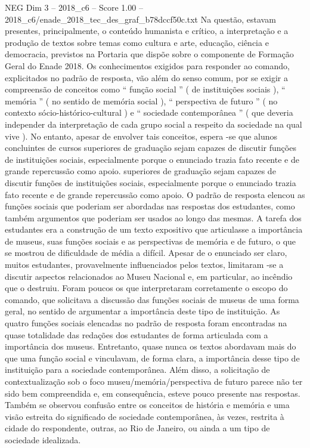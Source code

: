 \begin{textsample}{NEG Dim 3 – 2018\_c6 – Score 1.00 – 2018\_c6/enade\_2018\_tec\_des\_graf\_b78dccf50c.txt}
Na questão, estavam presentes, principalmente, o conteúdo humanista e crítico, a interpretação e a produção de textos sobre temas como cultura e arte, educação, ciência e democracia, previstos na Portaria que dispõe sobre o componente de Formação Geral do Enade 2018.
Os conhecimentos exigidos para responder ao comando, explicitados no padrão de resposta, vão além do senso comum, por se exigir a compreensão de conceitos como “ função social ” ( de instituições sociais ), “ memória ” ( no sentido de memória social ), “ perspectiva de futuro ” ( no contexto sócio-histórico-cultural ) e “ sociedade contemporânea ” ( que deveria independer da interpretação de cada grupo social a respeito da sociedade na qual vive ).
No entanto, apesar de envolver tais conceitos, espera -se que alunos concluintes de cursos superiores de graduação sejam capazes de discutir funções de instituições sociais, especialmente porque o enunciado trazia fato recente e de grande repercussão como apoio. superiores de graduação sejam capazes de discutir funções de instituições sociais, especialmente porque o enunciado trazia fato recente e de grande repercussão como apoio.
O padrão de resposta elencou as funções sociais que poderiam ser abordadas nas respostas dos estudantes, como também argumentos que poderiam ser usados ao longo das mesmas.
A tarefa dos estudantes era a construção de um texto expositivo que articulasse a importância de museus, suas funções sociais e as perspectivas de memória e de futuro, o que se mostrou de dificuldade de média a difícil.
Apesar de o enunciado ser claro, muitos estudantes, provavelmente influenciados pelos textos, limitaram -se a discutir aspectos relacionados ao Museu Nacional e, em particular, ao incêndio que o destruiu.
Foram poucos os que interpretaram corretamente o escopo do comando, que solicitava a discussão das funções sociais de museus de uma forma geral, no sentido de argumentar a importância deste tipo de instituição.
As quatro funções sociais elencadas no padrão de resposta foram encontradas na quase totalidade das redações dos estudantes de forma articulada com a importância dos museus.
Entretanto, quase nunca os textos abordavam mais do que uma função social e vinculavam, de forma clara, a importância desse tipo de instituição para a sociedade contemporânea.
Além disso, a solicitação de contextualização sob o foco museu/memória/perspectiva de futuro parece não ter sido bem compreendida e, em consequência, esteve pouco presente nas respostas.
Também se observou confusão entre os conceitos de história e memória e uma visão estreita do significado de sociedade contemporânea, às vezes, restrita à cidade do respondente, outras, ao Rio de Janeiro, ou ainda a um tipo de sociedade idealizada.

\end{textsample}
